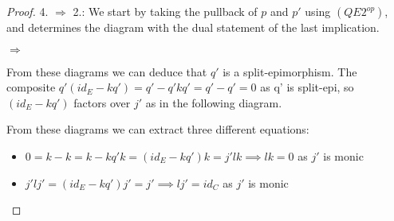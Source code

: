 \begin{proof}
        4. $\Rightarrow$ 2.: We start by taking the pullback of $p$ and $p'$ using $(QE2^{op})$, and determines the diagram with the dual statement of the last implication.
        \begin{center}
            \space $\Rightarrow$
        \end{center}
        From these diagrams we can deduce that $q'$ is a split-epimorphism. The composite $q'(id_E-kq')=q'-q'kq'=q'-q'=0$ as q' is split-epi, so $(id_E-kq')$ factors over $j'$ as in the following diagram.
        \begin{center}
        \end{center}
        From these diagrams we can extract three different equations:
        \begin{itemize}
            \item $0=k-k=k-kq'k=(id_E-kq')k=j'lk \implies lk=0$ as $j'$ is monic
            \item $j'lj'=(id_E-kq')j'=j'\implies lj'=id_C$ as $j'$ is monic

\end{itemize}
\end{proof}
